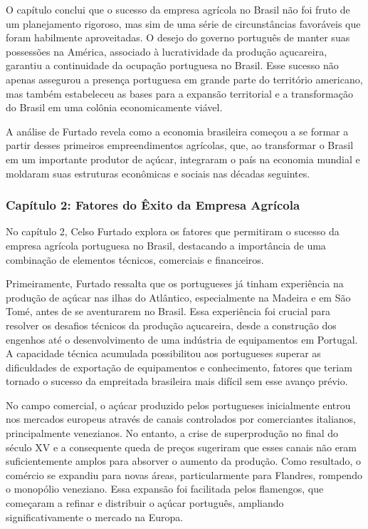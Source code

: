 \documentclass[a4paper,12pt]{article}[abntex2]
\begin{document}
O capítulo conclui que o sucesso da empresa agrícola no Brasil não foi fruto de um planejamento rigoroso, mas sim de uma série de circunstâncias favoráveis que foram habilmente aproveitadas. O desejo do governo português de manter suas possessões na América, associado à lucratividade da produção açucareira, garantiu a continuidade da ocupação portuguesa no Brasil. Esse sucesso não apenas assegurou a presença portuguesa em grande parte do território americano, mas também estabeleceu as bases para a expansão territorial e a transformação do Brasil em uma colônia economicamente viável.

A análise de Furtado revela como a economia brasileira começou a se formar a partir desses primeiros empreendimentos agrícolas, que, ao transformar o Brasil em um importante produtor de açúcar, integraram o país na economia mundial e moldaram suas estruturas econômicas e sociais nas décadas seguintes.

\subsubsection{\textbf{Capítulo 2: Fatores do Êxito da Empresa Agrícola}}

No capítulo 2, Celso Furtado explora os fatores que permitiram o sucesso da empresa agrícola portuguesa no Brasil, destacando a importância de uma combinação de elementos técnicos, comerciais e financeiros.

Primeiramente, Furtado ressalta que os portugueses já tinham experiência na produção de açúcar nas ilhas do Atlântico, especialmente na Madeira e em São Tomé, antes de se aventurarem no Brasil. Essa experiência foi crucial para resolver os desafios técnicos da produção açucareira, desde a construção dos engenhos até o desenvolvimento de uma indústria de equipamentos em Portugal. A capacidade técnica acumulada possibilitou aos portugueses superar as dificuldades de exportação de equipamentos e conhecimento, fatores que teriam tornado o sucesso da empreitada brasileira mais difícil sem esse avanço prévio.

No campo comercial, o açúcar produzido pelos portugueses inicialmente entrou nos mercados europeus através de canais controlados por comerciantes italianos, principalmente venezianos. No entanto, a crise de superprodução no final do século XV e a consequente queda de preços sugeriram que esses canais não eram suficientemente amplos para absorver o aumento da produção. Como resultado, o comércio se expandiu para novas áreas, particularmente para Flandres, rompendo o monopólio veneziano. Essa expansão foi facilitada pelos flamengos, que começaram a refinar e distribuir o açúcar português, ampliando significativamente o mercado na Europa.
\end{document}
